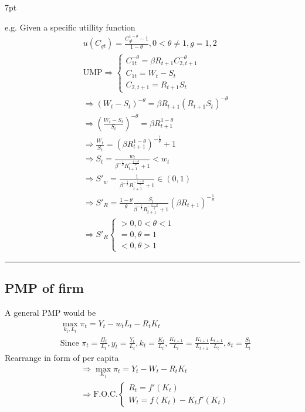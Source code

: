 \documentclass{article}
\newcommand*\sepline{%
  \begin{center}
    \rule[1ex]{.5\textwidth}{.5pt}
  \end{center}}
\newenvironment{greenblock}{%
\def\FrameCommand{%
  \hspace{1pt}%
    {\color{Green}%
    \vrule width 2pt}%
    {\color{greenshade}%
    \vrule width 4pt}%
  \colorbox{greenshade}%
}%
\MakeFramed{%
  \advance%
  \hsize-%
  \width%
  \FrameRestore}%
\noindent\hspace{-4.55pt}%
\begin{adjustwidth}{}{7pt}%
\vspace{2pt}\vspace{2pt}%
}
{%
\vspace{2pt}\end{adjustwidth}\endMakeFramed%
}
\begin{document}
\begin{greenblock}
e.g. Given a specific utillity function
\begin{align}
&u(C_{gt})=\frac{C_{gt}^{1-\theta}-1}{1-\theta},0<\theta\neq1, g =1,2
\\&\text{UMP}\Rightarrow 
\begin{cases}
C_{1t}^{-\theta}=\beta R_{t+1}C_{2,t+1}^{-\theta} \\
C_{1t}=W_{t}-S_{t} \\
C_{2,t+1}=R_{t+1}S_{t}\end{cases}
\\&\Rightarrow(W_{t}-S_{t})^{-\theta}=\beta R_{t+1}(R_{t+1}S_{t} )^{-\theta}
\\&\Rightarrow (\frac{W_{t}-S_{t}}{S_{t}})^{-\theta}=\beta R^{1-\theta}_{t+1}
\\&\Rightarrow \frac{W_{t}}{S_{t}}=(\beta R_{t+1}^{1-\theta})^{-\frac{1}{\theta}}+1
\\&\Rightarrow S_{t}=\frac{w_{t}}{\beta^{-\frac{1}{\theta}}R_{t+1}^{-\frac{1-\theta}{\theta}}+1}<w_{t}
\\&\Rightarrow S'_{w}=\frac{1}{\beta^{-\frac{1}{\theta}}R_{t+1}^{-\frac{1-\theta}{\theta}}+1} \in (0,1)
\\&\Rightarrow S'_{R}=\frac{1-\theta}{\theta}\frac{S_{t}}{\beta^{-\frac{1}{\theta}}R_{t+1}^{-\frac{1-\theta}{\theta}}+1}(\beta R_{t+1})^{-\frac{1}{\theta}}
\\&\Rightarrow S'_{R} \begin{cases}
>0, 0<\theta<1 \\
=0, \theta = 1 \\
<0, \theta >1\end{cases}
\end{align}
\end{greenblock}


\sepline
\subsection{PMP of firm}
A general PMP would be
\begin{align}
&\max_{k_{t},L_{t}} \pi_{t} =Y_{t}-w_{t}L_{t}-R_{t}K_{t}
\\&\text{Since }
\pi_{t}=\frac{\Pi_{t}}{L_{t}},y_{t}=\frac{Y_{t}}{L_{t}},k_{t}=\frac{K_{t}}{L_{t}}, \frac{K_{t+1}}{L_{t}}=\frac{K_{t+1}}{L_{t+1}}\frac{L_{t+1}}{L_{t}},s_{t}=\frac{S_{t}}{L_{t}}
\end{align}
Rearrange in form of per capita
\begin{align}
&\Rightarrow \max_{K_{t}} \pi_{t}=Y_{t}-W_{t}-R_{t}K_{t}
\\&\Rightarrow \text{F.O.C.}\begin{cases} R_{t}=f'(K_{t}) \\
W_{t}=f(K_{t})-K_{t}f'(K_{t})
\end{cases}
\end{align}
\end{document}
